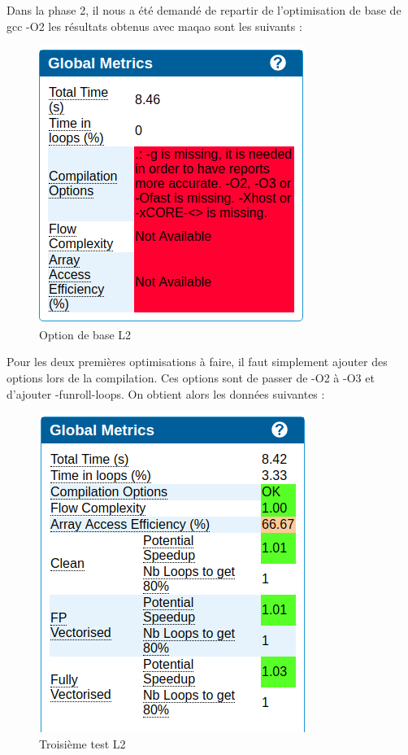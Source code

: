 \documentclass[12pt,a4paper]{article}
\begin{document}
Dans la phase 2, il nous a été demandé de repartir de l'optimisation de base de
gcc -O2 les résultats obtenus avec maqao sont les suivants : 

\begin{figure}[ht]
    \centering
    \includegraphics[scale=0.6]{figures/L2/L2T1.png}
    \caption{Option de base L2}
\end{figure}

Pour les deux premières optimisations à faire, il faut simplement ajouter 
des options lors de la compilation. Ces options sont de passer de -O2 à 
-O3 et d'ajouter -funroll-loops. On obtient alors les données suivantes : 

\begin{figure}[ht]
    \centering
    \includegraphics[scale=0.6]{figures/L2/L2T3.png}
    \caption{Troisième test L2}
\end{figure}
\end{document}
